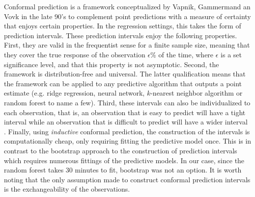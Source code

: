 \documentclass[10pt]{amsart}%
\begin{document}
Conformal prediction is a framework conceptualized by Vapnik, Gammermand an Vovk in the late 90's to complement point predictions with a measure of certainty that enjoys certain properties. In the regression settings, this takes the form of prediction intervals. These prediction intervals enjoy the following properties. First, they are valid in the frequentist sense for a finite sample size, meaning that they cover the true response of the observation $\epsilon \%$ of the time, where $\epsilon$ is a set significance level, and that this property is not asymptotic. Second, the framework is distribution-free and universal. The latter qualification means that the framework can be applied to any predictive algorithm that outputs a point estimate (e.g. ridge regression, neural network, $k$-nearest neighbor algorithm or random forest to name a few). Third, these intervals can also be individualized to each observation, that is, an observation that is easy to predict will have a tight interval while an observation that is difficult to predict will have a wider interval \cite{Papadopoulos.2011}. Finally, using \textit{inductive} conformal prediction, the construction of the intervals is computationally cheap, only requiring fitting the predictive model once. This is in contrast to the bootstrap approach to the construction of prediction intervals which requires numerous fittings of the predictive models. In our case, since the random forest takes $30$ minutes to fit, bootstrap was not an option. It is worth noting that the only assumption made to construct conformal prediction intervals is the exchangeability of the observations.
\end{document}
